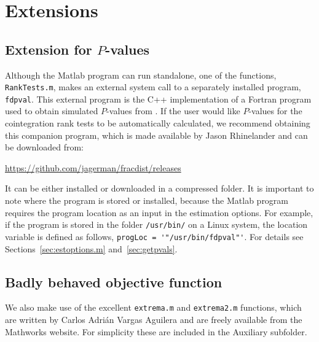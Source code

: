 \documentclass[article]{jss}
\begin{document}


\section{Extensions} \label{sec:extensions}




\subsection{Extension for $P$-values} \label{sec:fdpval}


Although the Matlab program can run standalone, one of the functions, \verb|RankTests.m|, makes an external system call to a separately installed program, \verb|fdpval|. This external program is the C++ implementation of a Fortran program used to obtain simulated $P$-values from \cite{mackinnon2014numerical}. If the user would like $P$-values for the cointegration rank tests to be automatically calculated, we recommend obtaining this companion program, which is made available by Jason Rhinelander and can be downloaded from: 
\begin{center} \url{https://github.com/jagerman/fracdist/releases}
\end{center}
It can be either installed or downloaded in a compressed folder. It is important to note where the program is stored or installed, because the Matlab program requires the program location as an input in the estimation options. For example, if the program is stored in the folder \verb|/usr/bin/| on a Linux system, the location variable is defined as follows, \verb|progLoc = '"/usr/bin/fdpval"'|. For details see Sections~\ref{sec:estoptions.m} and~\ref{sec:getpvals}.

\subsection{Badly behaved objective function}

We also make use of the excellent \verb|extrema.m| and \verb|extrema2.m| functions, which are written by Carlos Adrián Vargas Aguilera and are freely available from the Mathworks website. For simplicity these are included in the Auxiliary subfolder.
\end{document}
